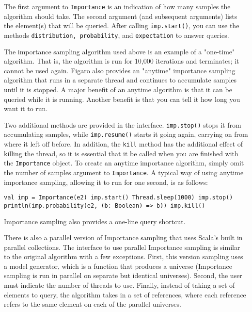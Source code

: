 The first argument to \texttt{Importance} is an indication of how many samples the algorithm should take. The second argument (and subsequent arguments) lists the element(s) that will be queried. After calling \texttt{imp.start()}, you can use the methods \texttt{distribution, probabil\-ity}, and \texttt{expectation} to answer queries.

The importance sampling algorithm used above is an example of a "one-time" algorithm. That is, the algorithm is run for 10,000 iterations and terminates; it cannot be used again. Figaro also provides an "anytime" importance sampling algorithm that runs in a separate thread and continues to accumulate samples until it is stopped. A major benefit of an anytime algorithm is that it can be queried while it is running. Another benefit is that you can tell it how long you want it to run.

Two additional methods are provided in the interface. \texttt{imp.stop()} stops it from accumulating samples, while \texttt{imp.resume()} starts it going again, carrying on from where it left off before. In addition, the \texttt{kill} method has the additional effect of killing the thread, so it is essential that it be called when you are finished with the \texttt{Importance} object. To create an anytime importance algorithm, simply omit the number of samples argument to \texttt{Importance}. A typical way of using anytime importance sampling, allowing it to run for one second, is as follows:

\begin{flushleft}
\texttt{val imp = Importance(e2) 
\newline imp.start() 
\newline Thread.sleep(1000) 
\newline imp.stop()
\newline println(imp.probability(e2, (b: Boolean) => b))
\newline imp.kill() }
\end{flushleft}

Importance sampling also provides a one-line query shortcut.

There is also a parallel version of Importance sampling that uses Scala's built in parallel collections. The interface to use parallel Importance sampling is similar to the original algorithm with a few exceptions. First, this version sampling uses a model generator, which is a function that produces a universe (Importance sampling is run in parallel on separate but identical universes). Second, the user must indicate the number of threads to use. Finally, instead of taking a set of elements to query, the algorithm takes in a set of references, where each reference refers to the same element on each of the parallel universes.

